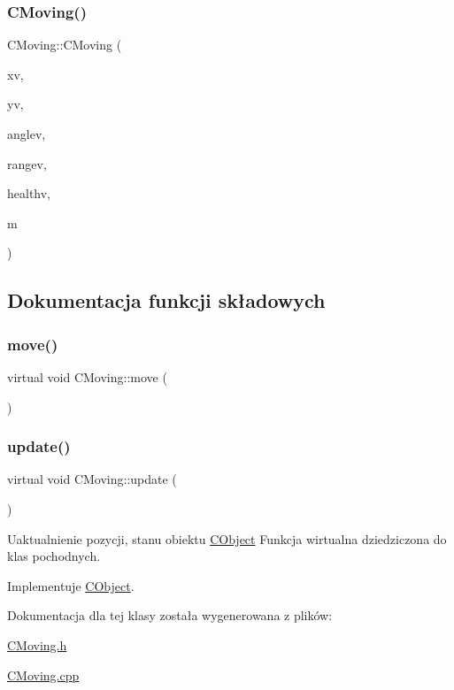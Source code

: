 \subsubsection{\texorpdfstring{C\+Moving()}{CMoving()}}
{\footnotesize\ttfamily C\+Moving\+::\+C\+Moving (\begin{DoxyParamCaption}\item[{qreal}]{xv,  }\item[{qreal}]{yv,  }\item[{qreal}]{anglev,  }\item[{qreal}]{rangev,  }\item[{qreal}]{healthv,  }\item[{\mbox{\hyperlink{class_c_map}{C\+Map}} $\ast$}]{m }\end{DoxyParamCaption})}



\subsection{Dokumentacja funkcji składowych}
\mbox{\label{class_c_moving_a5c5fe3a8d5f0735ad902d670185ad24c}} 
\subsubsection{\texorpdfstring{move()}{move()}}
{\footnotesize\ttfamily virtual void C\+Moving\+::move (\begin{DoxyParamCaption}{ }\end{DoxyParamCaption})\hspace{0.3cm}{\ttfamily [pure virtual]}}

\mbox{\label{class_c_moving_a11819555956e63f6d43466d3ccd3653c}} 
\subsubsection{\texorpdfstring{update()}{update()}}
{\footnotesize\ttfamily virtual void C\+Moving\+::update (\begin{DoxyParamCaption}{ }\end{DoxyParamCaption})\hspace{0.3cm}{\ttfamily [pure virtual]}}



Uaktualnienie pozycji, stanu obiektu \mbox{\hyperlink{class_c_object}{C\+Object}} Funkcja wirtualna dziedziczona do klas pochodnych. 



Implementuje \mbox{\hyperlink{class_c_object_acb42ca516e836d0267ddb9a0556916a9}{C\+Object}}.



Dokumentacja dla tej klasy została wygenerowana z plików\+:\begin{DoxyCompactItemize}
\item 
\mbox{\hyperlink{_c_moving_8h}{C\+Moving.\+h}}\item 
\mbox{\hyperlink{_c_moving_8cpp}{C\+Moving.\+cpp}}\end{DoxyCompactItemize}
